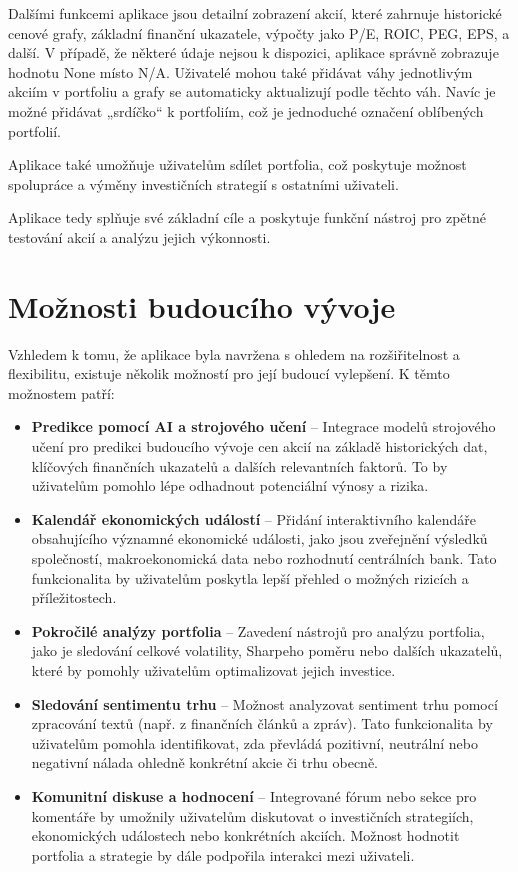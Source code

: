 \documentclass[12pt, a4paper]{report}
\begin{document}
Dalšími funkcemi aplikace jsou detailní zobrazení akcií, které zahrnuje historické cenové grafy, základní finanční ukazatele, výpočty jako P/E, ROIC, PEG, EPS, a další. V případě, že některé údaje nejsou k dispozici, aplikace správně zobrazuje hodnotu None místo N/A. Uživatelé mohou také přidávat váhy jednotlivým akciím v portfoliu a grafy se automaticky aktualizují podle těchto váh. Navíc je možné přidávat „srdíčko“ k portfoliím, což je jednoduché označení oblíbených portfolií.

Aplikace také umožňuje uživatelům sdílet portfolia, což poskytuje možnost spolupráce a výměny investičních strategií s ostatními uživateli.

Aplikace tedy splňuje své základní cíle a poskytuje funkční nástroj pro zpětné testování akcií a analýzu jejich výkonnosti.


\section{Možnosti budoucího vývoje}


Vzhledem k tomu, že aplikace byla navržena s ohledem na rozšiřitelnost a flexibilitu, existuje několik možností pro její budoucí vylepšení. K těmto možnostem patří:

\begin{itemize}
    \item \textbf{Predikce pomocí AI a strojového učení} – Integrace modelů strojového učení pro predikci budoucího vývoje cen akcií na základě historických dat, klíčových finančních ukazatelů a dalších relevantních faktorů. To by uživatelům pomohlo lépe odhadnout potenciální výnosy a rizika.
    \item \textbf{Kalendář ekonomických událostí} – Přidání interaktivního kalendáře obsahujícího významné ekonomické události, jako jsou zveřejnění výsledků společností, makroekonomická data nebo rozhodnutí centrálních bank. Tato funkcionalita by uživatelům poskytla lepší přehled o možných rizicích a příležitostech.
    \item \textbf{Pokročilé analýzy portfolia} – Zavedení nástrojů pro analýzu portfolia, jako je sledování celkové volatility, Sharpeho poměru nebo dalších ukazatelů, které by pomohly uživatelům optimalizovat jejich investice.
    \item \textbf{Sledování sentimentu trhu} – Možnost analyzovat sentiment trhu pomocí zpracování textů (např. z finančních článků a zpráv). Tato funkcionalita by uživatelům pomohla identifikovat, zda převládá pozitivní, neutrální nebo negativní nálada ohledně konkrétní akcie či trhu obecně.
    \item \textbf{Komunitní diskuse a hodnocení} – Integrované fórum nebo sekce pro komentáře by umožnily uživatelům diskutovat o investičních strategiích, ekonomických událostech nebo konkrétních akciích. Možnost hodnotit portfolia a strategie by dále podpořila interakci mezi uživateli.
\end{itemize}
\end{document}

